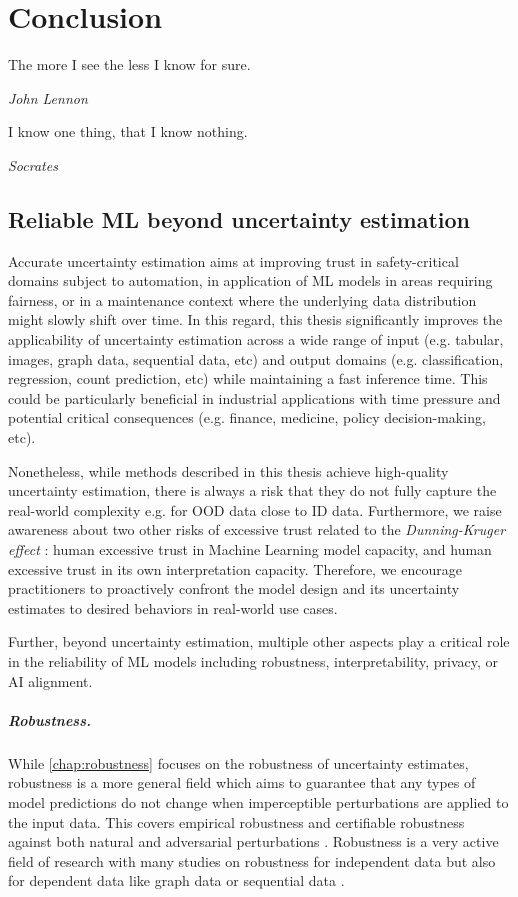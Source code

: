 \chapter{Conclusion}
\label{chap:conclusion}

\epigraph{The more I see the less I know for sure.}{\textit{John Lennon}}

\epigraph{I know one thing, that I know nothing.}{\textit{Socrates}}

\section{Reliable ML beyond uncertainty estimation}

Accurate uncertainty estimation aims at improving trust in safety-critical domains subject to automation, in application of ML models in areas requiring fairness, or in a maintenance context where the underlying data distribution might slowly shift over time. In this regard, this thesis significantly improves the applicability of uncertainty estimation across a wide range of input (e.g. tabular, images, graph data, sequential data, etc) and output domains (e.g. classification, regression, count prediction, etc) while maintaining a fast inference time. This could be particularly beneficial in industrial applications with time pressure and potential critical consequences (e.g. finance, medicine, policy decision-making, etc).

Nonetheless, while methods described in this thesis achieve high-quality uncertainty estimation, there is always a risk that they do not fully capture the real-world complexity e.g. for OOD data close to ID data. Furthermore, we raise awareness about two other risks of excessive trust related to the \emph{Dunning-Kruger effect} \citep{dunning-kruger}: human excessive trust in Machine Learning model capacity, and human excessive trust in its own interpretation capacity. Therefore, we encourage practitioners to proactively confront the model design and its uncertainty estimates to desired behaviors in real-world use cases.

Further, beyond uncertainty estimation, multiple other aspects play a critical role in the reliability of ML models including robustness, interpretability, privacy, or AI alignment.

\paragraph{Robustness.} While \cref*{chap:robustness} focuses on the robustness of uncertainty estimates, robustness is a more general field which aims to guarantee that any types of model predictions do not change when imperceptible perturbations are applied to the input data. This covers empirical robustness and certifiable robustness against both natural and adversarial perturbations \cite{tu2020empirical, chun2020empirical, cohen2019, zugner2020certifiable}. Robustness is a very active field of research with many studies on robustness for independent data \cite{silva2020opportunies} but also for dependent data like graph data \cite{GNNBook-ch8-gunnemann} or sequential data \cite{cheng2020}.

